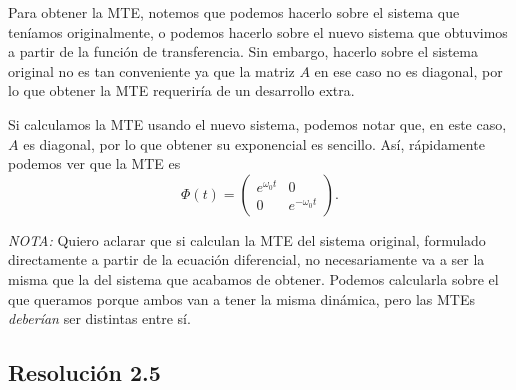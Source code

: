 \documentclass[
  11pt,
  letterpaper,
   addpoints,
  answers
  ]{exam}
\begin{document}
\begin{questions}
\begin{solution}
Para obtener la MTE, notemos que podemos hacerlo sobre el sistema que teníamos originalmente, o podemos hacerlo sobre el nuevo sistema que obtuvimos a partir de la función de transferencia. Sin embargo, hacerlo sobre el sistema original no es tan conveniente ya que la matriz $A$ en ese caso no es diagonal, por lo que obtener la MTE requeriría de un desarrollo extra.

Si calculamos la MTE usando el nuevo sistema, podemos notar que, en este caso, $A$ es diagonal, por lo que obtener su exponencial es sencillo. Así, rápidamente podemos ver que la MTE es
\begin{equation}
\Phi(t)=
\begin{pmatrix}
e^{\omega_0 t}&0\\[2pt]
0&e^{-\omega_0 t}
\end{pmatrix}.
\end{equation}

\textit{NOTA:} Quiero aclarar que si calculan la MTE del sistema original, formulado directamente a partir de la ecuación diferencial, no necesariamente va a ser la misma que la del sistema que acabamos de obtener. Podemos calcularla sobre el que queramos porque ambos van a tener la misma dinámica, pero las MTEs \emph{deberían} ser distintas entre sí.

\subsection*{Resolución 2.5}


\end{solution}
\end{questions}
\end{document}
